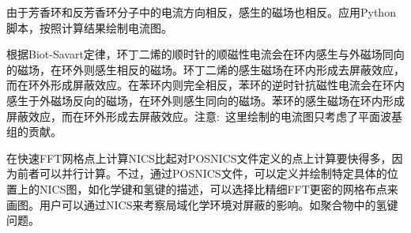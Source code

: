 由于芳香环和反芳香环分子中的电流方向相反，感生的磁场也相反。应用\textrm{Python}脚本，按照计算结果绘制电流图。

根据\textrm{Biot-Savart}定律，环丁二烯的顺时针的顺磁性电流会在环内感生与外磁场同向的磁场，在环外则感生相反的磁场。环丁二烯的感生磁场在环内形成去屏蔽效应，而在环外形成屏蔽效应。在苯环内则完全相反，苯环的逆时针抗磁性电流会在环内感生于外磁场反向的磁场，在环外则感生同向的磁场。苯环的感生磁场在环内形成屏蔽效应，而在环外形成去屏蔽效应。注意:~这里绘制的电流图只考虑了平面波基组的贡献。

在快速\textrm{FFT}网格点上计算\textrm{NICS}比起对\textrm{POSNICS}文件定义的点上计算要快得多，因为前者可以并行计算。不过，通过\textrm{POSNICS}文件，可以定义并绘制特定具体的位置上的\textrm{NICS}图，如化学键和氢键的描述，可以选择比精细\textrm{FFT}更密的网格布点来画图。用户可以通过\textrm{NICS}来考察局域化学环境对屏蔽的影响。如聚合物中的氢键问题。


